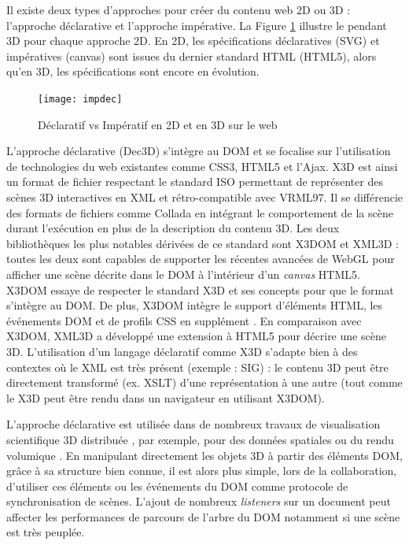 Il existe deux types d'approches pour créer du contenu web 2D ou 
3D : l'approche déclarative et l'approche impérative. La Figure \ref{fig:impdec} 
illustre le pendant \gls{3D} pour chaque approche 2D. En 2D, les spécifications 
déclaratives (\gls{SVG}) et impératives (canvas) sont issues du dernier standard 
HTML (HTML5), alors qu'en \gls{3D}, les spécifications sont encore en évolution. 

\begin{figure}[hbt]
	\centering
	\texttt{[image: impdec]}
	\caption{Déclaratif vs Impératif en 2D et en \gls{3D} sur le web}
	\label{fig:impdec}
\end{figure}

L'approche déclarative (Dec3D) s'intègre au \gls{DOM} et se 
focalise sur l'utilisation de technologies du web existantes comme CSS3, 
HTML5 et l'Ajax. 
X3D est ainsi un format de fichier respectant le standard ISO \cite{X3D2011} permettant de 
représenter des scènes \gls{3D} interactives en XML et rétro-compatible avec 
VRML97. Il 
se différencie des formats de fichiers comme Collada en intégrant le comportement de 
la scène durant l'exécution en plus de la description du contenu \gls{3D}. Les deux 
bibliothèques les plus notables dérivées de ce standard sont X3DOM 
\cite{Behr2010} et XML3D \cite{Sons2010} : toutes les deux sont capables de 
supporter les récentes avancées de WebGL pour afficher une scène décrite dans 
le \gls{DOM} à l'intérieur d'un \textit{canvas} HTML5. 
X3DOM essaye de respecter le standard X3D et ses concepts pour que le format s'intègre au \gls{DOM}. De plus, X3DOM intègre le support 
d'éléments \gls{HTML}, les événements \gls{DOM} et de profils \acrshort{CSS} en 
supplément \cite{Sutter2015}. 
En comparaison avec X3DOM, XML3D a développé une extension à \gls{HTML}5 
pour décrire une scène \gls{3D}. 
L'utilisation d'un langage déclaratif comme X3D s'adapte bien à des contextes où 
le XML est très présent (exemple : \gls{SIG}) : le contenu \gls{3D} peut être 
directement transformé (ex. XSLT) d'une 
représentation à une autre (tout comme le X3D peut être rendu dans un navigateur 
en utilisant X3DOM). 

L'approche déclarative est utilisée dans de nombreux travaux de visualisation 
scientifique \gls{3D} distribuée \cite{Jung2012}, par exemple, pour des données 
spatiales 
\cite{Stein2014} ou du rendu volumique \cite{Becher2012}. 
En manipulant directement les objets \gls{3D} à partir des éléments \gls{DOM}, 
grâce à 
sa structure bien connue, il est alors plus simple, lors de la collaboration, d'utiliser 
ces éléments \cite{Gadea2016} ou les événements du \gls{DOM} \cite{Lowet2009} 
comme protocole de synchronisation de scènes. 
L'ajout de nombreux \textit{listeners} sur un document peut affecter les 
performances de parcours de l'arbre du \gls{DOM} notamment si une scène est
très peuplée.

